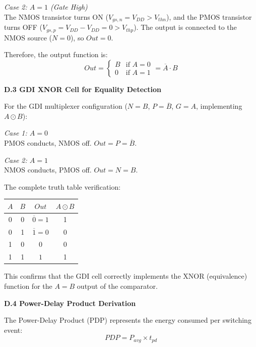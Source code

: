 \documentclass[12pt,a4paper,oneside]{report}
\begin{document}
\noindent\textit{Case 2: $A = 1$ (Gate High)}\\
The NMOS transistor turns ON ($V_{gs,n} = V_{DD} > V_{thn}$), and the PMOS transistor turns OFF ($V_{gs,p} = V_{DD} - V_{DD} = 0 > V_{thp}$). The output is connected to the NMOS source ($N = 0$), so $Out = 0$.

\noindent Therefore, the output function is:
\begin{equation}
Out = \begin{cases} B & \text{if } A = 0 \\ 0 & \text{if } A = 1 \end{cases} = \overline{A} \cdot B
\end{equation}

\vspace{0.5cm}
\noindent\textbf{D.3 GDI XNOR Cell for Equality Detection}

\noindent For the GDI multiplexer configuration ($N=B$, $P=\overline{B}$, $G=A$, implementing $A \odot B$):

\noindent\textit{Case 1: $A = 0$}\\
PMOS conducts, NMOS off. $Out = P = \overline{B}$.

\noindent\textit{Case 2: $A = 1$}\\
NMOS conducts, PMOS off. $Out = N = B$.

\noindent The complete truth table verification:
\begin{center}
\begin{tabular}{|c|c|c|c|}
\hline
$A$ & $B$ & $Out$ & $A \odot B$ \\
\hline
0 & 0 & $\overline{0} = 1$ & 1 \\
\hline
0 & 1 & $\overline{1} = 0$ & 0 \\
\hline
1 & 0 & $0$ & 0 \\
\hline
1 & 1 & $1$ & 1 \\
\hline
\end{tabular}
\end{center}

\noindent This confirms that the GDI cell correctly implements the XNOR (equivalence) function for the $A=B$ output of the comparator.

\vspace{0.5cm}
\noindent\textbf{D.4 Power-Delay Product Derivation}

\noindent The Power-Delay Product (PDP) represents the energy consumed per switching event:
\begin{equation}
PDP = P_{avg} \times t_{pd}
\end{equation}
\end{document}
